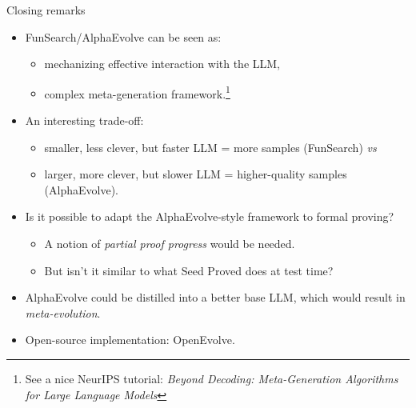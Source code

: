 \documentclass{beamer}
\begin{document}
\begin{frame}{Closing remarks}
\begin{itemize}
\item FunSearch/AlphaEvolve can be seen as:
\begin{itemize}
\item mechanizing effective interaction with the LLM,
\item complex meta-generation framework.\footnote{See a nice NeurIPS tutorial:
\textit{Beyond Decoding: Meta-Generation Algorithms for Large Language Models}}
\end{itemize}
\item An interesting trade-off:
\begin{itemize}
\item smaller, less clever, but faster LLM = more samples (FunSearch) \textit{vs}
\item larger, more clever, but slower LLM = higher-quality samples (AlphaEvolve).
\end{itemize}
\item Is it possible to adapt the AlphaEvolve-style framework to formal proving?
    \begin{itemize}
    \item A notion of \textit{partial proof progress} would be needed.
    \item But isn't it similar to what Seed Proved does at test time?
    \end{itemize}
\item AlphaEvolve could be distilled into a better base LLM, which would result
in \textit{meta-evolution}.
\item Open-source implementation: OpenEvolve.
\end{itemize}
\end{frame}
\end{document}
